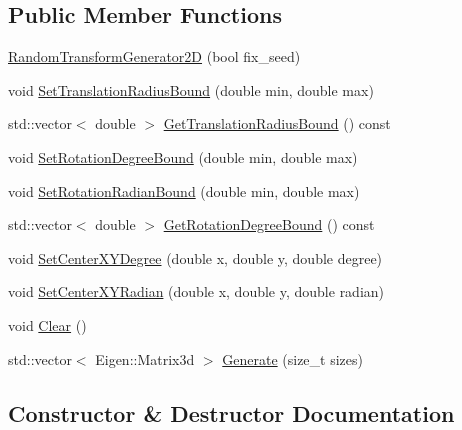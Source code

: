 \subsection*{Public Member Functions}
\begin{DoxyCompactItemize}
\item 
\hyperlink{classcommon_1_1RandomTransformGenerator2D_a78079deb60246ba451171ab5ab820e6b}{Random\+Transform\+Generator2D} (bool fix\+\_\+seed)
\item 
void \hyperlink{classcommon_1_1RandomTransformGenerator2D_a334855de9b28685e27d2bb6cb3f423c7}{Set\+Translation\+Radius\+Bound} (double min, double max)
\item 
std\+::vector$<$ double $>$ \hyperlink{classcommon_1_1RandomTransformGenerator2D_afcbec9b21347f39ef48343440108fcd1}{Get\+Translation\+Radius\+Bound} () const
\item 
void \hyperlink{classcommon_1_1RandomTransformGenerator2D_a66f5882e07364c8386e334dd45924ad1}{Set\+Rotation\+Degree\+Bound} (double min, double max)
\item 
void \hyperlink{classcommon_1_1RandomTransformGenerator2D_a1eec5f955bc92df186c436386be92006}{Set\+Rotation\+Radian\+Bound} (double min, double max)
\item 
std\+::vector$<$ double $>$ \hyperlink{classcommon_1_1RandomTransformGenerator2D_adf59341ea0685b55a7c6cdd511034694}{Get\+Rotation\+Degree\+Bound} () const
\item 
void \hyperlink{classcommon_1_1RandomTransformGenerator2D_ab8c8a315b296b53d19c1369686e2d0b1}{Set\+Center\+X\+Y\+Degree} (double x, double y, double degree)
\item 
void \hyperlink{classcommon_1_1RandomTransformGenerator2D_a47efdf50f3ec507de6f7810c9ea979b1}{Set\+Center\+X\+Y\+Radian} (double x, double y, double radian)
\item 
void \hyperlink{classcommon_1_1RandomTransformGenerator2D_a3d77f6b3bee9e7e29d29b88cbd6d5a91}{Clear} ()
\item 
std\+::vector$<$ Eigen\+::\+Matrix3d $>$ \hyperlink{classcommon_1_1RandomTransformGenerator2D_a63a297d3a8ef1abf0625d00373a0b8c9}{Generate} (size\+\_\+t sizes)
\end{DoxyCompactItemize}


\subsection{Constructor \& Destructor Documentation}
\mbox{\label{classcommon_1_1RandomTransformGenerator2D_a78079deb60246ba451171ab5ab820e6b}} 
